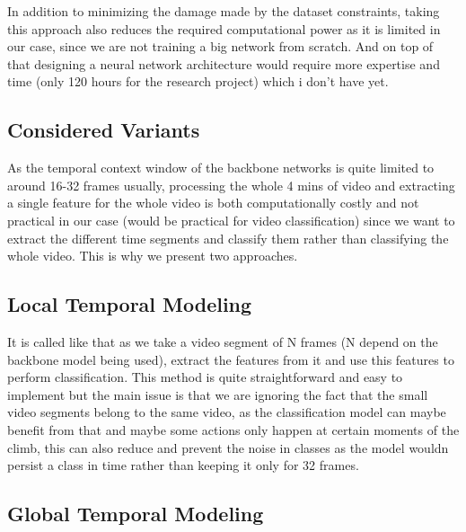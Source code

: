 In addition to minimizing the damage made by the dataset constraints, taking this approach also reduces the required computational power as it is limited in our case, since we are not training a big network from scratch. And on top of that designing a neural network architecture would require more expertise and time (only 120 hours for the research project) which i don't have yet.

\subsection*{Considered Variants}

As the temporal context window of the backbone networks is quite limited to around 16-32 frames usually, processing the whole 4 mins of video and extracting a single feature for the whole video is both computationally costly and not practical in our case (would be practical for video classification) since we want to extract the different time segments and classify them rather than classifying the whole video.
This is why we present two approaches.

\subsection{Local Temporal Modeling}
It is called like that as we take a video segment of N frames (N depend on the backbone model being used), extract the features from it and use this features to perform classification.
This method is quite straightforward and easy to implement but the main issue is that we are ignoring the fact that the small video segments belong to the same video, as the classification model 
can maybe benefit from that and maybe some actions only happen at certain moments of the climb, this can also reduce and prevent the noise in classes as the model wouldn persist a class in time rather than keeping it only for 32 frames.


\subsection{Global Temporal Modeling}


